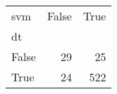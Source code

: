 \begin{tabular}{lrr}
\toprule
svm &  False &  True  \\
dt    &        &        \\
\midrule
False &     29 &     25 \\
True  &     24 &    522 \\
\bottomrule
\end{tabular}

